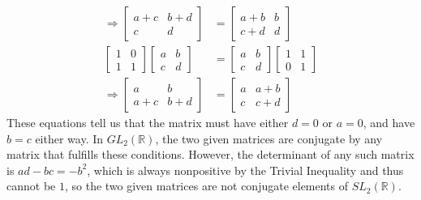 \documentclass[a4paper,12pt]{article}
\begin{document}
\begin{enumerate}
\begin{align*}
            \Rightarrow \left[ \begin{array}{cc}
                    a + c & b + d \\
                    c & d
            \end{array} \right]
            &= \left[ \begin{array}{cc}
                    a + b & b \\
                    c + d & d
            \end{array} \right] \\
            \left[ \begin{array}{cc}
                    1 & 0 \\
                    1 & 1
            \end{array} \right]
            \left[ \begin{array}{cc}
                    a & b \\
                    c & d
            \end{array} \right]
            &= \left[ \begin{array}{cc}
                    a & b \\
                    c & d
            \end{array} \right]
            \left[ \begin{array}{cc}
                    1 & 1 \\
                    0 & 1
            \end{array} \right] \\
            \Rightarrow \left[ \begin{array}{cc}
                    a & b \\
                    a + c & b + d
            \end{array} \right]
            &= \left[ \begin{array}{cc}
                    a & a + b \\
                    c & c + d
            \end{array} \right]
        \end{align*}
        These equations tell us that the matrix must have either $d = 0$ or $a = 0$, and have $b = c$ either way. In $GL_2(\mathbb{R})$, the two given matrices are conjugate by any matrix that fulfills these conditions. However, the determinant of any such matrix is $ad - bc = -b^2$, which is always nonpositive by the Trivial Inequality and thus cannot be $1$, so the two given matrices are not conjugate elements of $SL_2(\mathbb{R})$.


\end{enumerate}
\end{document}
